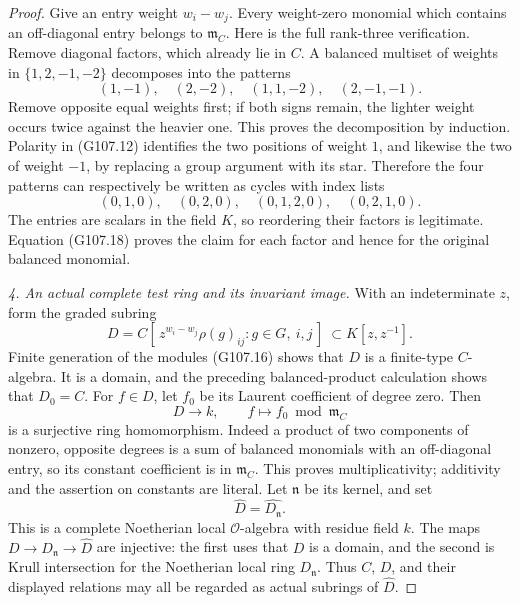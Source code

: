 \begin{proof}
Give an entry weight \(w_i-w_j\).
Every weight-zero monomial which contains an
off-diagonal entry belongs to \(\mathfrak m_C\).
Here is the full rank-three verification.
Remove diagonal factors, which already lie in \(C\).
A balanced multiset of weights in \(\{1,2,-1,-2\}\)
decomposes into the patterns
\[
 (1,-1),\quad(2,-2),\quad(1,1,-2),\quad(2,-1,-1).
 \tag{G107.19}
\]
Remove opposite equal weights first; if both signs
remain, the lighter weight occurs twice against the
heavier one.  This proves the decomposition by induction.
Polarity in (G107.12) identifies the two positions
of weight \(1\), and likewise the two of weight \(-1\),
by replacing a group argument with its star.
Therefore the four patterns can respectively be
written as cycles with index lists
\[
        (0,1,0),\quad(0,2,0),\quad
        (0,1,2,0),\quad(0,2,1,0).
 \tag{G107.20}
\]
The entries are scalars in the field \(K\), so
reordering their factors is legitimate.
Equation (G107.18) proves the claim for each factor
and hence for the original balanced monomial.

\emph{4. An actual complete test ring and its invariant image.}
With an indeterminate \(z\), form the graded subring
\[
 D=C[\,z^{w_i-w_j}\rho(g)_{ij}:g\in G,\ i,j\,]
                           \ \subset K[z,z^{-1}].
 \tag{G107.21}
\]
Finite generation of the modules (G107.16) shows that
\(D\) is a finite-type \(C\)-algebra.
It is a domain, and the preceding balanced-product
calculation shows that \(D_0=C\).
For \(f\in D\), let \(f_0\) be its Laurent coefficient
of degree zero.  Then
\[
          D\longrightarrow k,\qquad
             f\longmapsto f_0\bmod\mathfrak m_C
 \tag{G107.22}
\]
is a surjective ring homomorphism.
Indeed a product of two components of nonzero,
opposite degrees is a sum of balanced monomials with
an off-diagonal entry, so its constant coefficient
is in \(\mathfrak m_C\).  This proves multiplicativity;
additivity and the assertion on constants are literal.
Let \(\mathfrak n\) be its kernel, and set
\[
                         \widehat D=\widehat{D_{\mathfrak n}}.
 \tag{G107.23}
\]
This is a complete Noetherian local
\(\mathcal O\)-algebra with residue field \(k\).
The maps \(D\to D_{\mathfrak n}\to\widehat D\) are
injective: the first uses that \(D\) is a domain,
and the second is Krull intersection for the
Noetherian local ring \(D_{\mathfrak n}\).
Thus \(C\), \(D\), and their displayed relations may
all be regarded as actual subrings of \(\widehat D\).


\end{proof}
